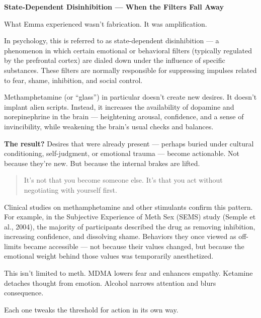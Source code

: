 \begin{TechnicalSidebar}{\textbf{State-Dependent Disinhibition — When the Filters Fall Away}}

  What Emma experienced wasn’t fabrication. It was amplification.

  \medskip
  
  In psychology, this is referred to as state-dependent disinhibition — a phenomenon in which 
  certain emotional or behavioral filters (typically regulated by the prefrontal cortex) are 
  dialed down under the influence of specific substances. These filters are normally responsible 
  for suppressing impulses related to fear, shame, inhibition, and social control.

  \medskip
  
  Methamphetamine (or “glass”) in particular doesn’t create new desires. It doesn’t implant alien 
  scripts. Instead, it increases the availability of dopamine and norepinephrine in the brain — 
  heightening arousal, confidence, and a sense of invincibility, while weakening the brain’s usual 
  checks and balances.
  
  \medskip
  
  \textbf{The result?}
  Desires that were already present — perhaps buried under cultural conditioning, self-judgment, 
  or emotional trauma — become actionable. Not because they’re new. But because the internal 
  brakes are lifted.
  
  \begin{quote}
  It’s not that you become someone else.
  It’s that you act without negotiating with yourself first.
  \end{quote}
  
  Clinical studies on methamphetamine and other stimulants confirm this pattern. For example, in 
  the Subjective Experience of Meth Sex (SEMS) study (Semple et al., 2004), the majority of 
  participants described the drug as removing inhibition, increasing confidence, and dissolving 
  shame. Behaviors they once viewed as off-limits became accessible — not because their values 
  changed, but because the emotional weight behind those values was temporarily anesthetized.
  
  \medskip
  
  This isn’t limited to meth.
  MDMA lowers fear and enhances empathy.
  Ketamine detaches thought from emotion.
  Alcohol narrows attention and blurs consequence.

  \medskip
  
  Each one tweaks the threshold for action in its own way.
  

\end{TechnicalSidebar}
